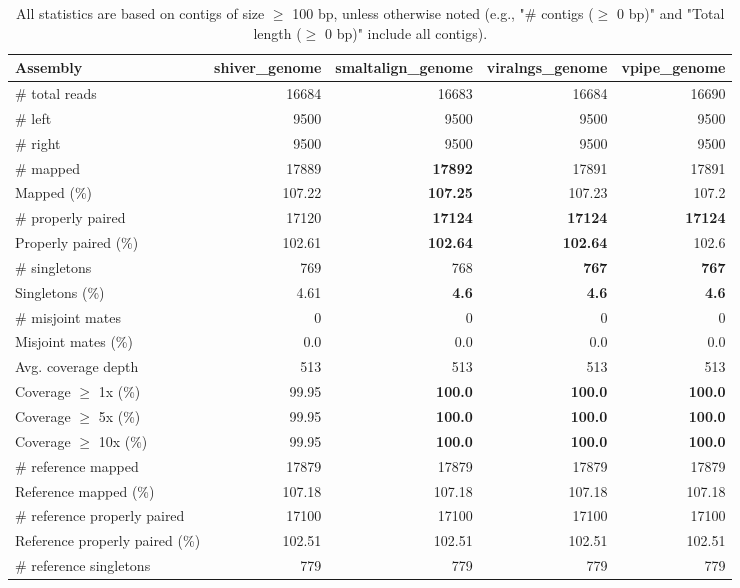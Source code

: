 \documentclass[12pt,a4paper]{article}
\begin{document}
\begin{table}[ht]
\begin{center}
\caption{All statistics are based on contigs of size $\geq$ 100 bp, unless otherwise noted (e.g., "\# contigs ($\geq$ 0 bp)" and "Total length ($\geq$ 0 bp)" include all contigs).}
\begin{tabular}{|l*{4}{|r}|}
\hline
Assembly & shiver\_genome & smaltalign\_genome & viralngs\_genome & vpipe\_genome \\ \hline
\# total reads & 16684 & 16683 & 16684 & 16690 \\ \hline
\# left & 9500 & 9500 & 9500 & 9500 \\ \hline
\# right & 9500 & 9500 & 9500 & 9500 \\ \hline
\# mapped & 17889 & {\bf 17892} & 17891 & 17891 \\ \hline
Mapped (\%) & 107.22 & {\bf 107.25} & 107.23 & 107.2 \\ \hline
\# properly paired & 17120 & {\bf 17124} & {\bf 17124} & {\bf 17124} \\ \hline
Properly paired (\%) & 102.61 & {\bf 102.64} & {\bf 102.64} & 102.6 \\ \hline
\# singletons & 769 & 768 & {\bf 767} & {\bf 767} \\ \hline
Singletons (\%) & 4.61 & {\bf 4.6} & {\bf 4.6} & {\bf 4.6} \\ \hline
\# misjoint mates & 0 & 0 & 0 & 0 \\ \hline
Misjoint mates (\%) & 0.0 & 0.0 & 0.0 & 0.0 \\ \hline
Avg. coverage depth & 513 & 513 & 513 & 513 \\ \hline
Coverage $\geq$ 1x (\%) & 99.95 & {\bf 100.0} & {\bf 100.0} & {\bf 100.0} \\ \hline
Coverage $\geq$ 5x (\%) & 99.95 & {\bf 100.0} & {\bf 100.0} & {\bf 100.0} \\ \hline
Coverage $\geq$ 10x (\%) & 99.95 & {\bf 100.0} & {\bf 100.0} & {\bf 100.0} \\ \hline
\# reference mapped & 17879 & 17879 & 17879 & 17879 \\ \hline
Reference mapped (\%) & 107.18 & 107.18 & 107.18 & 107.18 \\ \hline
\# reference properly paired & 17100 & 17100 & 17100 & 17100 \\ \hline
Reference properly paired (\%) & 102.51 & 102.51 & 102.51 & 102.51 \\ \hline
\# reference singletons & 779 & 779 & 779 & 779 \\ \hline

\end{tabular}
\end{center}
\end{table}
\end{document}
